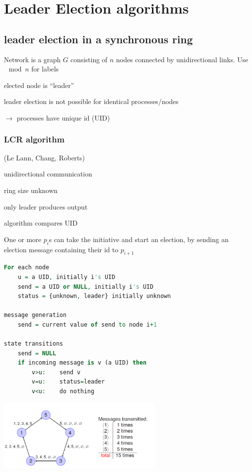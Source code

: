 \chapter{Leader Election algorithms}
\section{leader election in a synchronous ring}
Network is a graph $G$ consisting of $n$ nodes connected by unidirectional links. Use $\mod n$ for labels\\
\begin{compactitem}
\item elected node is ``leader''
\item leader election is not possible for identical processes/nodes
\item [$\rightarrow$] processes have unique id (UID)
\end{compactitem}

\subsection{LCR algorithm}
(Le Lann, Chang, Roberts)\\

\begin{compactitem}
\item unidirectional communication
\item ring size unknown
\item only leader produces output
\item algorithm compares UID
\item One or more $p_i$s can take the initiative and start an election, by sending an election message containing their id to $p_{i+1}$
\end{compactitem}

\begin{lstlisting}[mathescape, language=VHDL]
For each node
	u = a UID, initially i's UID
	send = a UID or NULL, initially i's UID
	status = {unknown, leader} initially unknown

message generation
	send = current value of send to node i+1

state transitions
	send = NULL
	if incoming message is v (a UID) then
		v>u: 	send v
		v=u: 	status=leader
		v<u: 	do nothing
\end{lstlisting}

\begin{minipage}{\linewidth}
	\centering\includegraphics[width=310px]{gfx/lcr.png}
	\label{img:lcr}
\end{minipage}



